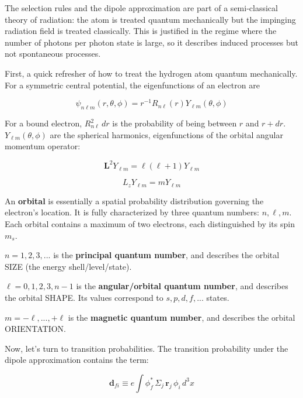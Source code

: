 \documentclass[12pt, letterpaper, preprint]{aastex}
\begin{document}
\begin{enumerate}
The selection rules and the dipole approximation are part of a semi-classical theory of radiation: the atom is treated quantum mechanically but the impinging radiation field is treated classically. This is justified in the regime where the number of photons per photon state is large, so it describes induced processes but not spontaneous processes.

First, a quick refresher of how to treat the hydrogen atom quantum mechanically.
For a symmetric central potential, the eigenfunctions of an electron are

\begin{equation}
\psi_{n \ell m} (r, \theta, \phi) = r^{-1} R_{n \ell}(r) Y_{\ell m}(\theta, \phi)
\end{equation}

For a bound electron, $R_{n\ell}^2\,dr$ is the probability of being between $r$ and $r+dr$. $Y_{\ell m}(\theta, \phi)$ are the spherical harmonics,
eigenfunctions of the orbital angular momentum operator:

\begin{equation}
\mathbf{L}^2 Y_{\ell m} = \ell (\ell + 1) Y_{\ell m}
\end{equation}

\begin{equation}
L_z Y_{\ell m} = m Y_{\ell m}
\end{equation}

An \textbf{orbital} is essentially a spatial probability distribution governing the electron's location. It is fully characterized by three quantum numbers: $n, \ell, m$. Each orbital contains a maximum of two electrons, each distinguished by its spin $m_s$. 

$n = 1, 2, 3, ...$ is the \textbf{principal quantum number}, and describes the orbital SIZE (the energy shell/level/state).

$\ell = 0, 1, 2, 3, n-1$ is the \textbf{angular/orbital quantum number}, and describes the orbital SHAPE. Its values correspond to
$s, p, d, f, ...$ states. 

$m = -\ell, ..., +\ell$ is the \textbf{magnetic quantum number}, and describes the orbital ORIENTATION. 

Now, let's turn to transition probabilities. The transition probability under the dipole approximation contains the term: 

\begin{equation}
\mathbf{d}_{fi} \equiv e \int \phi_f^* \, \Sigma_j \,  \mathbf{r}_j \, \phi_i \, d^3 x
\label{eq:dipole-element}
\end{equation}


\end{enumerate}
\end{document}
